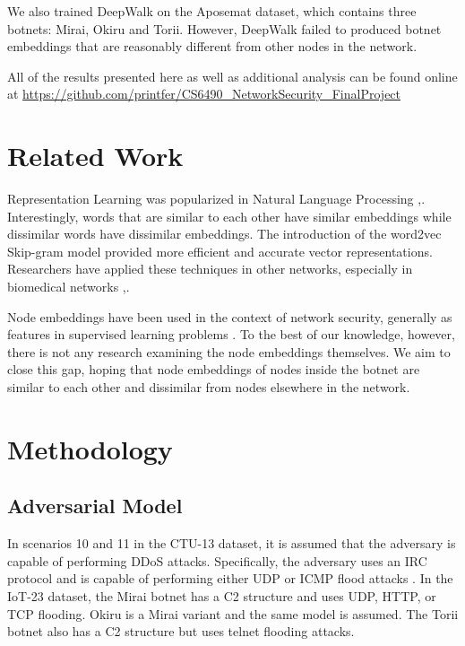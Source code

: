 \documentclass[10pt]{article}
\begin{document}
\begin{multicols}{2}
We also trained DeepWalk on the Aposemat \cite{IoT-23} dataset, which contains three botnets: Mirai, Okiru and Torii. However, DeepWalk failed to produced botnet embeddings that are reasonably different from other nodes in the network.

All of the results presented here as well as additional analysis can be found online at \url{https://github.com/printfer/CS6490_NetworkSecurity_FinalProject}

\section{Related Work}

Representation Learning was popularized in Natural Language Processing \cite{Camacho},\cite{Madelbaum}. Interestingly, words that are similar to each other have similar embeddings while dissimilar words have dissimilar embeddings. The introduction of the word2vec Skip-gram model \cite{Mikolov} provided more efficient and accurate vector representations.  Researchers have applied these techniques in other networks, especially in biomedical networks \cite{Perkins},\cite{Yue}.

Node embeddings have been used in the context of network security, generally as features in supervised learning problems \cite{Skorniakov}. To the best of our knowledge, however, there is not any research examining the node embeddings themselves. We aim to close this gap, hoping that node embeddings of nodes inside the botnet are similar to each other and dissimilar from nodes elsewhere in the network.

\section{Methodology}

\subsection{Adversarial Model}
In scenarios 10 and 11 in the CTU-13 dataset, it is assumed that the adversary is capable of performing DDoS attacks. Specifically, the adversary uses an IRC protocol and is capable of performing either UDP or ICMP flood attacks \cite{Garcia}. In the IoT-23 dataset, the Mirai botnet has a C2 structure and uses UDP, HTTP, or TCP flooding. Okiru is a Mirai variant and the same model is assumed. The Torii botnet also has a C2 structure but uses telnet flooding attacks.


\end{multicols}
\end{document}
